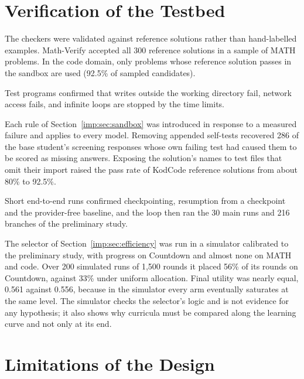 \section{Verification of the Testbed}
\label{imp:sec:verification}

\begin{description}[itemsep=3pt,topsep=4pt]
  \item[Answer checkers.] The checkers were validated against reference solutions rather
    than hand-labelled examples. Math-Verify accepted all 300 reference solutions in a
    sample of MATH problems. In the code domain, only problems whose reference solution
    passes in the sandbox are used (92.5\% of sampled candidates).
  \item[Sandbox.] Test programs confirmed that writes outside the working directory fail,
    network access fails, and infinite loops are stopped by the time limits.
  \item[Harness rules.] Each rule of Section~\ref{imp:sec:sandbox} was introduced in
    response to a measured failure and applies to every model. Removing appended
    self-tests recovered 286 of the base student's screening responses whose own failing
    test had caused them to be scored as missing answers. Exposing the solution's names
    to test files that omit their import raised the pass rate of KodCode reference
    solutions from about 80\% to 92.5\%.
  \item[Training loop.] Short end-to-end runs confirmed checkpointing, resumption from a
    checkpoint and the provider-free baseline, and the loop then ran the 30 main runs
    and 216 branches of the preliminary study.
  \item[Selector in simulation.] The selector of Section~\ref{imp:sec:efficiency} was run
    in a simulator calibrated to the preliminary study, with progress on Countdown and
    almost none on MATH and code. Over 200 simulated runs of 1,500 rounds it placed 56\%
    of its rounds on Countdown, against 33\% under uniform allocation. Final utility was
    nearly equal, 0.561 against 0.556, because in the simulator every arm eventually
    saturates at the same level. The simulator checks the selector's logic and is not
    evidence for any hypothesis; it also shows why curricula must be compared along the
    learning curve and not only at its end.
\end{description}

\section{Limitations of the Design}
\label{imp:sec:limitations}

